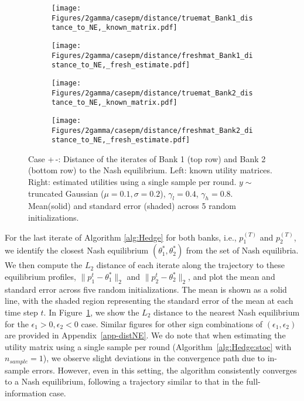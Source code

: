 \begin{figure}[H]
    \centering
   {
    \begin{subfigure}{0.49\linewidth}
        \centering
        \texttt{[image: Figures/2gamma/casepm/distance/truemat\_Bank1\_distance\_to\_NE,\_known\_matrix.pdf]}
    \end{subfigure}
    \begin{subfigure}{0.49\linewidth}
        \centering
        \texttt{[image: Figures/2gamma/casepm/distance/freshmat\_Bank1\_distance\_to\_NE,\_fresh\_estimate.pdf]}
    \end{subfigure}

    \begin{subfigure}{0.49\linewidth}
        \centering
        \texttt{[image: Figures/2gamma/casepm/distance/truemat\_Bank2\_distance\_to\_NE,\_known\_matrix.pdf]}
    \end{subfigure}
    \begin{subfigure}{0.49\linewidth}
        \centering
        \texttt{[image: Figures/2gamma/casepm/distance/freshmat\_Bank2\_distance\_to\_NE,\_fresh\_estimate.pdf]}
    \end{subfigure}
    }
\caption{Case +\,-: Distance of the iterates of Bank 1 (top row) and Bank 2 (bottom row) to the Nash equilibrium. Left: known utility matrices. Right: estimated utilities using a single sample per round. $y \sim$ truncated Gaussian ($\mu=0.1, \sigma=0.2$), $\gamma_l = 0.4$, $\gamma_h = 0.8$. Mean(solid) and standard error (shaded) across 5 random initializations.\label{fig:dist-pm}}
\end{figure}
For the last iterate of Algorithm \ref{alg:Hedge} for both banks, i.e., \( p_1^{(T)} \) and \( p_2^{(T)} \), we identify the closest Nash equilibrium \( (\theta_1^*, \theta_2^*) \) from the set of Nash equilibria. We then compute the \( L_2 \) distance of each iterate along the trajectory to these equilibrium profiles, \( \|p_1^t - \theta_1^*\|_2 \) and \( \|p_2^t - \theta_2^*\|_2 \), and plot the mean and standard error across five random initializations. The mean is shown as a solid line, with the shaded region representing the standard error of the mean at each time step \( t \).  In Figure~\ref{fig:dist-pm}, we show the \( L_2 \) distance to the nearest Nash equilibrium for the \( \epsilon_1 > 0, \epsilon_2 < 0 \) case. Similar figures for other sign combinations of \( (\epsilon_1, \epsilon_2) \) are provided in Appendix~\ref{app-distNE}. We do note that when estimating the utility matrix using a single sample per round (Algorithm~\ref{alg:Hedge:stoc} with $n_{sample} = 1$), we observe slight deviations in the convergence path due to in-sample errors. However, even in this setting, the algorithm consistently converges to a Nash equilibrium, following a trajectory similar to that in the full-information case.


